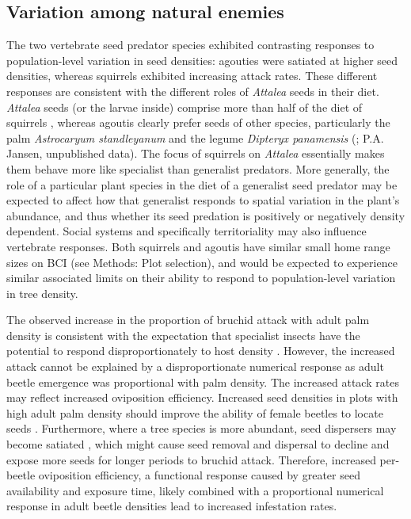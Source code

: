 \documentclass[b5paper,justified]{tufte-book} %
\begin{document}
\begin{fullwidth}
\subsection{Variation among natural enemies}
The two vertebrate seed predator species exhibited contrasting responses to population-level variation in seed densities: agouties were satiated at higher seed densities, whereas squirrels exhibited increasing attack rates. These different responses are consistent with the different roles of \textit{Attalea} seeds in their diet. \textit{Attalea} seeds (or the larvae inside) comprise more than half of the diet of squirrels \citep{Heaney1978}, whereas agoutis clearly prefer seeds of other species, particularly the palm \textit{Astrocaryum standleyanum} and the legume
\textit{Dipteryx panamensis} (\citealt{Smythe1978}; P.A. Jansen, unpublished data). The focus of squirrels on \textit{Attalea} essentially makes them behave more like specialist than generalist predators. More generally, the role of a particular plant species in the diet of a generalist seed predator may be expected to affect how that generalist responds to spatial variation in the plant's abundance, and thus whether its seed predation is positively or negatively density dependent. Social systems and specifically territoriality may also influence vertebrate responses. Both squirrels and agoutis have similar small home range sizes on BCI (see Methods: Plot selection), and would be expected to experience similar associated limits on their ability to respond to population-level variation in tree density.

The observed increase in the proportion of bruchid attack with adult palm density is consistent with the expectation that specialist insects have the potential to respond disproportionately to host density \citep{Hammond1998, Lewis2008}. However, the increased attack cannot be explained by a disproportionate numerical response as adult beetle emergence was proportional with palm density. The increased attack rates may reflect increased oviposition efficiency. Increased seed densities in plots with high adult palm density should improve the ability of female beetles to locate seeds \citep{Wilson1972}. Furthermore, where a tree species is more abundant, seed dispersers may become satiated \citep{Hampe2008}, which might cause seed removal and dispersal to decline \citep{Forget2007,Klinger2009} and expose more seeds for longer periods to bruchid attack. Therefore, increased per-beetle oviposition efficiency, a functional response caused by greater seed availability and exposure time, likely combined with a proportional numerical response in adult beetle densities lead to increased infestation rates.


\end{fullwidth}
\end{document}
